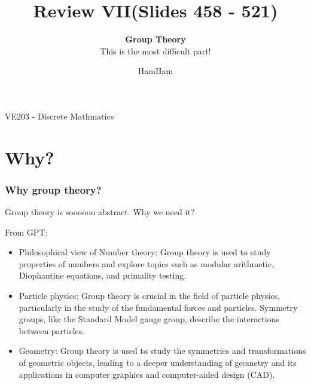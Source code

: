 \documentclass{beamer}
\title{\sffamily Review VII(Slides 458 - 521)}
\subtitle{\textbf{Group Theory} \\ This is the most difficult part!}
\institute[UM-SJTU JI]{University of Michigan-Shanghai Jiao Tong University Joint Institute}
\author{HamHam}
\newcommand{\myfont}{\rmfamily\normalsize\upshape\mdseries}
\begin{document}
\begin{titlepage}
    \begin{center}
        VE203 - Discrete Mathmatics 
    \end{center}
\end{titlepage}
\myfont
\newcommand{\binomial}[2]{\begin{pmatrix} {#1}\\{#2}	\end{pmatrix}}
\newcommand{\green}[1]{\textcolor[rgb]{0.3,0.6,0}{#1}}


\section{Why?}
\begin{frame}
    \frametitle{Why group theory?}

    Group theory is soooooo abstract. Why we need it?

    \begin{block}{From GPT:}
        \begin{itemize}
            \item Philosophical view of Number theory: Group theory is used to study properties of numbers and explore topics such as modular arithmetic, Diophantine equations, and primality testing.
            \item Particle physics: Group theory is crucial in the field of particle physics, particularly in the study of the fundamental forces and particles. Symmetry groups, like the Standard Model gauge group, describe the interactions between particles.
            \item Geometry: Group theory is used to study the symmetries and transformations of geometric objects, leading to a deeper understanding of geometry and its applications in computer graphics and computer-aided design (CAD).
        \end{itemize}
    \end{block}

\end{frame}
\end{document}
